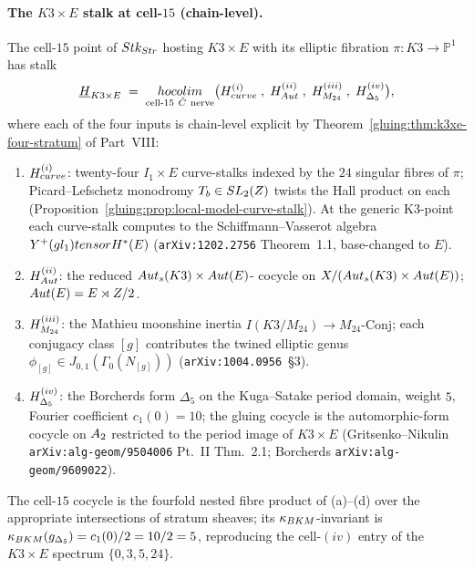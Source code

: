 \paragraph{The $K3\times E$ stalk at cell-$15$ (chain-level).} The
cell-$15$ point of $Stk_{Str}$ hosting $K3\times E$ with its
elliptic fibration $\pi:K3\to\mathbb{P}^{1}$ has stalk
\[
\underline{H}_{K3\times E}
\;=\;
\underset{\text{cell-}15\ \check{C}\ \text{nerve}}{hocolim}
\bigl(H^{(i)}_{curve}\;,\;H^{(ii)}_{Aut}\;,\;
H^{(iii)}_{M_{24}}\;,\;H^{(iv)}_{\Delta_{5}}\bigr),
\]
where each of the four inputs is chain-level explicit by
Theorem~\ref{gluing:thm:k3xe-four-stratum} of Part~VIII:
\begin{enumerate}[label=\textup{(\alph*)}]
 \item $H^{(i)}_{curve}$: twenty-four $I_{1}\times E$
  curve-stalks indexed by the $24$ singular fibres of $\pi$;
  Picard--Lefschetz monodromy $T_{b}\in SL_{2}(Z)$ twists the Hall
  product on each (Proposition~\ref{gluing:prop:local-model-curve-stalk}).
  At the generic K3-point each curve-stalk computes to the
  Schiffmann--Vasserot algebra $Y^{+}(gl_{1})tensor H^{*}(E)$
  (\texttt{arXiv:1202.2756} Theorem~1.1, base-changed to $E$).
 \item $H^{(ii)}_{Aut}$: the reduced $Aut_{s}(K3)\times Aut(E)$-
  cocycle on $X/(Aut_{s}(K3)\times Aut(E))$; $Aut(E)=E\rtimes Z/2$.
 \item $H^{(iii)}_{M_{24}}$: the Mathieu moonshine inertia
  $I(K3/M_{24})\to M_{24}\mathrm{\text{-}Conj}$; each conjugacy class
  $[g]$ contributes the twined elliptic genus
  $\phi_{[g]}\in J_{0,1}(\Gamma_{0}(N_{[g]}))$
  (\texttt{arXiv:1004.0956}~\S 3).
 \item $H^{(iv)}_{\Delta_{5}}$: the Borcherds form $\Delta_{5}$ on
  the Kuga--Satake period domain, weight $5$, Fourier coefficient
  $c_{1}(0)=10$; the gluing cocycle is the automorphic-form cocycle
  on $A_{2}$ restricted to the period image of $K3\times E$
  (Gritsenko--Nikulin \texttt{arXiv:alg-geom/9504006} Pt.~II Thm.~2.1;
  Borcherds \texttt{arXiv:alg-geom/9609022}).
\end{enumerate}
The cell-$15$ cocycle is the fourfold nested fibre product of (a)--(d)
over the appropriate intersections of stratum sheaves; its
$\kappa_{BKM}$-invariant is $\kappa_{BKM}(g_{\Delta_{5}})
=c_{1}(0)/2=10/2=5$, reproducing the cell-$(iv)$ entry
of the $K3\times E$ spectrum $\{0,3,5,24\}$.

